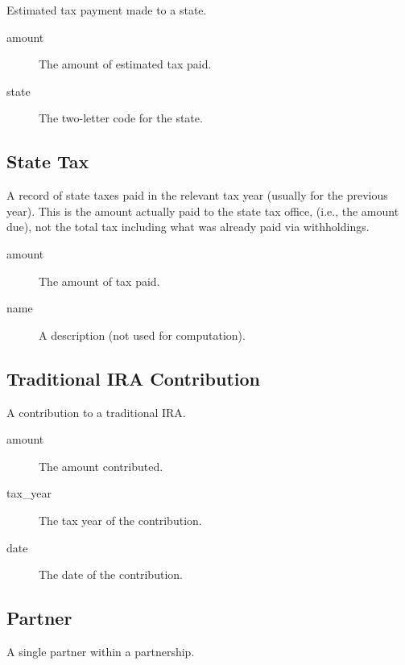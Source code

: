 \documentclass[12pt]{article}
\begin{document}
Estimated tax payment made to a state.

\begin{description}
\item[amount] The amount of estimated tax paid.
\item[state] The two-letter code for the state.
\end{description}




\subsection{State Tax}

A record of state taxes paid in the relevant tax year (usually for the previous
year). This is the amount actually paid to the state tax office, (i.e., the
amount due), not the total tax including what was already paid via withholdings.

\begin{description}
\item[amount] The amount of tax paid.
\item[name] A description (not used for computation).
\end{description}

\subsection{Traditional IRA Contribution}

A contribution to a traditional IRA.

\begin{description}
\item[amount] The amount contributed.
\item[tax\_year] The tax year of the contribution.
\item[date] The date of the contribution.
\end{description}


\subsection{Partner}

A single partner within a partnership.
\end{document}
